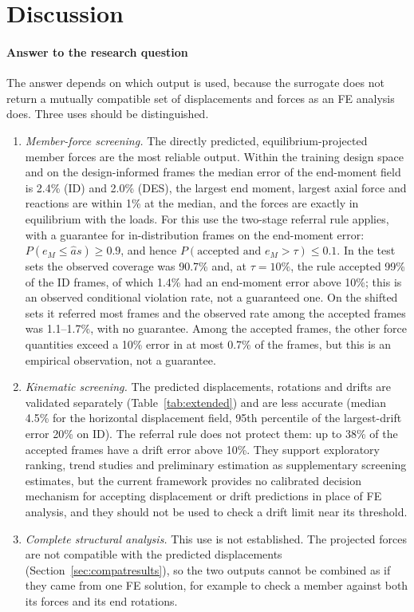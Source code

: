 \section{Discussion}\label{sec:discussion}

\paragraph{Answer to the research question} The answer depends on which output is used, because the surrogate does not return a mutually compatible set of displacements and forces as an FE analysis does. Three uses should be distinguished.
\begin{enumerate}
\item \emph{Member-force screening.} The directly predicted, equilibrium-projected member forces are the most reliable output. Within the training design space and on the design-informed frames the median error of the end-moment field is 2.4\% (ID) and 2.0\% (DES), the largest end moment, largest axial force and reactions are within 1\% at the median, and the forces are exactly in equilibrium with the loads. For this use the two-stage referral rule applies, with a guarantee for in-distribution frames on the end-moment error: $P(e_M\le\hat a s)\ge0.9$, and hence $P(\text{accepted and } e_M>\tau)\le0.1$. In the test sets the observed coverage was 90.7\% and, at $\tau=10\%$, the rule accepted 99\% of the ID frames, of which 1.4\% had an end-moment error above 10\%; this is an observed conditional violation rate, not a guaranteed one. On the shifted sets it referred most frames and the observed rate among the accepted frames was 1.1--1.7\%, with no guarantee. Among the accepted frames, the other force quantities exceed a 10\% error in at most 0.7\% of the frames, but this is an empirical observation, not a guarantee.
\item \emph{Kinematic screening.} The predicted displacements, rotations and drifts are validated separately (Table~\ref{tab:extended}) and are less accurate (median 4.5\% for the horizontal displacement field, 95th percentile of the largest-drift error 20\% on ID). The referral rule does not protect them: up to 38\% of the accepted frames have a drift error above 10\%. They support exploratory ranking, trend studies and preliminary estimation as supplementary screening estimates, but the current framework provides no calibrated decision mechanism for accepting displacement or drift predictions in place of FE analysis, and they should not be used to check a drift limit near its threshold.
\item \emph{Complete structural analysis.} This use is not established. The projected forces are not compatible with the predicted displacements (Section~\ref{sec:compatresults}), so the two outputs cannot be combined as if they came from one FE solution, for example to check a member against both its forces and its end rotations.
\end{enumerate}
